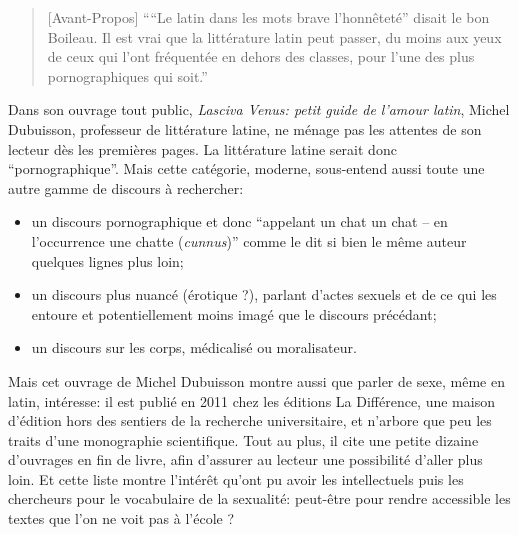 \begin{quote}[Avant-Propos]{\cite*{dubuisson_lasciva_2011}}
    \enquote{``Le latin dans les mots brave l'honnêteté'' disait le bon Boileau. Il est vrai que la littérature latin peut passer, du moins aux yeux de ceux qui l'ont fréquentée en dehors des classes, pour l'une des plus pornographiques qui soit.}
\end{quote}

Dans son ouvrage tout public, \textit{Lasciva Venus: petit guide de l'amour latin}, Michel Dubuisson, professeur de littérature latine, ne ménage pas les attentes de son lecteur dès les premières pages. La littérature latine serait donc \enquote{pornographique}. Mais cette catégorie, moderne, sous-entend aussi toute une autre gamme de discours à rechercher:
\begin{itemize}
    \item un discours pornographique et donc \enquote{appelant un chat un chat -- en l'occurrence une chatte (\textit{cunnus})} comme le dit si bien le même auteur quelques lignes plus loin;
    \item un discours plus nuancé (érotique ?), parlant d'actes sexuels et de ce qui les entoure et potentiellement moins imagé que le discours précédant;
    \item un discours sur les corps, médicalisé ou moralisateur.
\end{itemize}

Mais cet ouvrage de Michel Dubuisson montre aussi que parler de sexe, même en latin, intéresse: il est publié en 2011 chez les éditions La Différence, une maison d'édition hors des sentiers de la recherche universitaire, et n'arbore que peu les traits d'une monographie scientifique. Tout au plus, il cite une petite dizaine d'ouvrages en fin de livre, afin d'assurer au lecteur une possibilité d'aller plus loin. Et cette liste montre l'intérêt qu'ont pu avoir les intellectuels puis les chercheurs pour le vocabulaire de la sexualité: peut-être pour rendre accessible les textes que l'on ne voit pas à l'école ?

